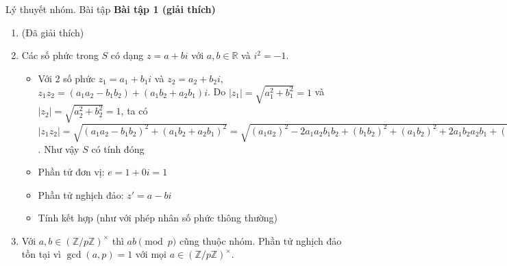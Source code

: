 \begin{frame}{Lý thuyết nhóm. Bài tập}
    \textbf{Bài tập 1 (giải thích)}
    \begin{enumerate}
        \item (Đã giải thích)
        \item Các số phức trong $S$ có dạng $z = a+bi$ với $a, b \in \mathbb{R}$ và $i^2=-1$. 
        \begin{itemize}
            \item Với 2 số phức $z_1 = a_1 + b_1 i$ và $z_2 = a_2 + b_2 i$, $z_1 z_2 = (a_1 a_2 - b_1 b_2) + (a_1 b_2 + a_2 b_1)i$. Do $|z_1| = \sqrt{a_1^2+b_1^2}=1$ và $|z_2| = \sqrt{a_2^2 + b_2^2} = 1$, ta có
            $|z_1 z_2| = \sqrt{(a_1 a_2 - b_1 b_2)^2 + (a_1 b_2 + a_2 b_1)^2} = \sqrt{(a_1 a_2)^2 - 2a_1a_2b_1b_2 + (b_1b_2)^2 + (a_1b_2)^2 + 2a_1b_2a_2b_1 + (a_2b_1)^2} = \sqrt{(a_1^2 + b_1^2)(a_2^2 + b_2^2)} = 1$. Như vậy $S$ có tính đóng
            \item Phần tử đơn vị: $e = 1 + 0i = 1$
            \item Phần tử nghịch đảo: $z' = a-bi$
            \item Tính kết hợp (như với phép nhân số phức thông thường)
        \end{itemize}
        \item Với $a, b \in (\mathbb{Z}/p\mathbb{Z})^{\times}$ thì $ab \pmod p$ cũng thuộc nhóm. Phần tử nghịch đảo tồn tại vì $\gcd(a, p) = 1$ với mọi $a \in (\mathbb{Z}/p\mathbb{Z})^{\times}$.
    \end{enumerate}
\end{frame}